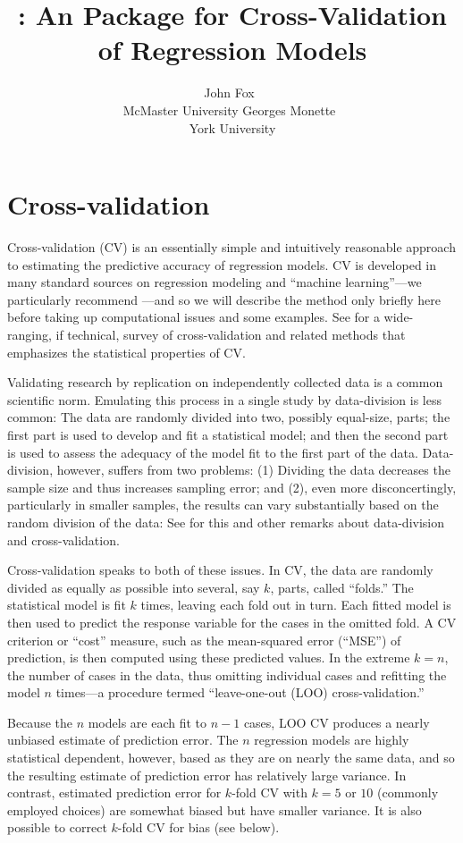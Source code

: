 \documentclass[
]{jss}
\author{
John Fox~\orcidlink{0000-0002-1196-8012}\\McMaster
University \And Georges Monette~\orcidlink{0000-0000-0000-0000}\\York
University
}
\title{\pkg{cv}: An \proglang{R} Package for Cross-Validation of
Regression Models}
\begin{document}
\hypertarget{cross-validation}{%
\section{Cross-validation}\label{cross-validation}}

Cross-validation (CV) is an essentially simple and intuitively
reasonable approach to estimating the predictive accuracy of regression
models. CV is developed in many standard sources on regression modeling
and ``machine learning''---we particularly recommend \citet[Secs. 5.1,
5.3]{JamesEtAl:2021}---and so we will describe the method only briefly
here before taking up computational issues and some examples. See
\citet{ArlotCelisse:2010} for a wide-ranging, if technical, survey of
cross-validation and related methods that emphasizes the statistical
properties of CV.

Validating research by replication on independently collected data is a
common scientific norm. Emulating this process in a single study by
data-division is less common: The data are randomly divided into two,
possibly equal-size, parts; the first part is used to develop and fit a
statistical model; and then the second part is used to assess the
adequacy of the model fit to the first part of the data. Data-division,
however, suffers from two problems: (1) Dividing the data decreases the
sample size and thus increases sampling error; and (2), even more
disconcertingly, particularly in smaller samples, the results can vary
substantially based on the random division of the data: See \citet[Sec.
5.3]{Harrell:2015} for this and other remarks about data-division and
cross-validation.

Cross-validation speaks to both of these issues. In CV, the data are
randomly divided as equally as possible into several, say \(k\), parts,
called ``folds.'' The statistical model is fit \(k\) times, leaving each
fold out in turn. Each fitted model is then used to predict the response
variable for the cases in the omitted fold. A CV criterion or ``cost''
measure, such as the mean-squared error (``MSE'') of prediction, is then
computed using these predicted values. In the extreme \(k = n\), the
number of cases in the data, thus omitting individual cases and
refitting the model \(n\) times---a procedure termed ``leave-one-out
(LOO) cross-validation.''

Because the \(n\) models are each fit to \(n - 1\) cases, LOO CV
produces a nearly unbiased estimate of prediction error. The \(n\)
regression models are highly statistical dependent, however, based as
they are on nearly the same data, and so the resulting estimate of
prediction error has relatively large variance. In contrast, estimated
prediction error for \(k\)-fold CV with \(k = 5\) or \(10\) (commonly
employed choices) are somewhat biased but have smaller variance. It is
also possible to correct \(k\)-fold CV for bias (see below).
\end{document}
